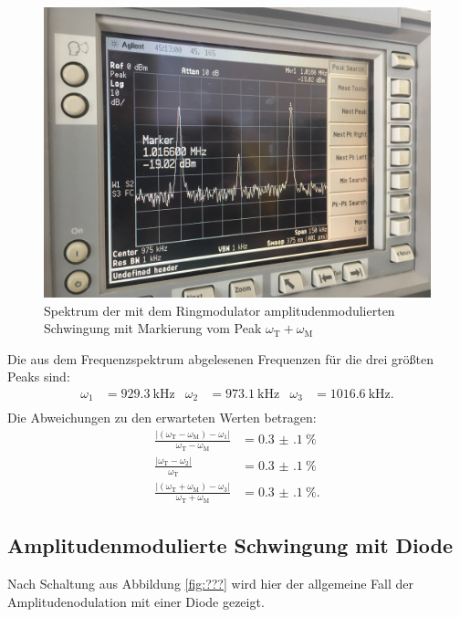 \begin{figure}[h]
  \includegraphics[width=.9\textwidth]{Spektrum_Pics/b3.jpg}
  \caption{Spektrum der mit dem Ringmodulator amplitudenmodulierten Schwingung mit Markierung vom Peak $\omega_\text{T} + \omega_\text{M}$}
  \label{fig:b3}
\end{figure}

Die aus dem Frequenzspektrum abgelesenen Frequenzen für die drei größten Peaks sind:
\begin{align*}
  \omega_1 &= \SI{929.3}{\kilo\hertz} & \omega_2 &= \SI{973.1}{\kilo\hertz} & \omega_3 &= \SI{1016.6}{\kilo\hertz}.\\
\end{align*}
Die Abweichungen zu den erwarteten Werten betragen:
\begin{align*}
  \frac{|(\omega_\text{T} - \omega_\text{M}) - \omega_1|}{\omega_\text{T} - \omega_\text{M}} &= \SI{0.3(1)}{\percent}\\
  \frac{|\omega_\text{T} - \omega_2|}{\omega_\text{T}} &= \SI{0.3(1)}{\percent}\\
  \frac{|(\omega_\text{T} + \omega_\text{M}) - \omega_3|}{\omega_\text{T} + \omega_\text{M}} &= \SI{0.3(1)}{\percent}.
\end{align*}

\subsection{Amplitudenmodulierte Schwingung mit Diode}

Nach Schaltung aus Abbildung \ref{fig:???} wird hier der allgemeine Fall der Amplitudenodulation mit einer Diode gezeigt.

